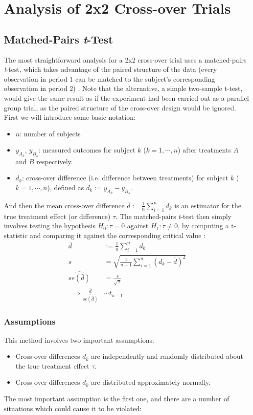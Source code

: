 \documentclass[12pt, TexShade, letterpaper]{report}
\begin{document}
\chapter{Analysis of 2x2 Cross-over Trials}

\section{Matched-Pairs \textit{t}-Test}
The most straightforward analysis for a 2x2 cross-over trial uses a matched-pairs \textit{t}-test, which takes advantage of the paired structure of the data (every observation in period 1 can be matched to the subject's corresponding observation in period 2) \cite{senn2002crossover}. Note that the alternative, a simple two-sample t-test, would give the same result as if the experiment had been carried out as a parallel group trial, as the paired structure of the cross-over design would be ignored. First we will introduce some basic notation:
\begin{itemize}
    \item $n$: number of subjects
    \item $y_{A_k}$, $y_{B_k}$: measured outcomes for subject $k$ ($k=1,\cdots,n$) after treatments $A$ and $B$ respectively.
    \item $d_k$: cross-over difference (i.e. difference between treatments) for subject $k$ ($k=1,\cdots,n$), defined as $d_k := y_{A_k}-y_{B_k}$.
\end{itemize}
And then the mean cross-over difference $\bar{d} := \frac{1}{n}\sum_{i=1}^{n}d_k$ is an estimator for the true treatment effect (or difference) $\tau$. The matched-pairs \textit{t}-test then simply involves testing the hypothesis $H_0: \tau = 0$ against $H_1: \tau \neq 0$, by computing a t-statistic and comparing it against the corresponding critical value \cite{senn2002crossover}:
\begin{align*}
    \bar{d} &:= \frac{1}{n}\sum_{i=1}^{n}d_k \\
    s &= \sqrt{\frac{1}{n-1}\sum_{i=1}^{n}(d_k-\bar{d})^2} \\
    \widehat{se(\bar{d})} &= \frac{s}{\sqrt{n}} \\
    \implies \frac{\bar{d}}{\widehat{se(\bar{d})}} &\sim t_{n-1}
\end{align*}

\subsection{Assumptions}
This method involves two important assumptions:
\begin{itemize}
    \item Cross-over differences $d_k$ are independently and randomly distributed about the true treatment effect $\tau$.
    \item Cross-over differences $d_k$ are distributed approximately normally.
\end{itemize}
The most important assumption is the first one, and there are a number of situations which could cause it to be violated:
\end{document}
